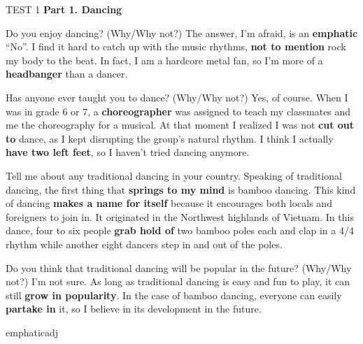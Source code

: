 \begin{glossarymc}[Cambridge 6]
    \begin{test}{TEST 1}
    \noindent
    \textbf{Part 1. Dancing}
    \begin{qa}{Do you enjoy dancing? (Why/Why not?)}
    The answer, I’m afraid, is an \textbf{emphatic} “No”. I find it hard to catch up with the music rhythms, \textbf{not to mention} rock my body to the beat. In fact, I am a hardcore metal fan, so I’m more of a \textbf{headbanger} than a dancer.
    \end{qa}

    \begin{qa}{Has anyone ever taught you to dance? (Why/Why not?)}
    Yes, of course. When I was in grade 6 or 7, a \textbf{choreographer} was assigned to teach my classmates and me the choreography for a musical. At that moment I realized I was not \textbf{cut out to} dance, as I kept disrupting the group’s natural rhythm. I think I actually \textbf{have two left feet}, so I haven’t tried dancing anymore.
    \end{qa}

    \begin{qa}{Tell me about any traditional dancing in your country.}
    Speaking of traditional dancing, the first thing that \textbf{springs to my mind} is bamboo dancing. This kind of dancing \textbf{makes a name for itself} because it encourages both locals and foreigners to join in. It originated in the Northwest highlands of Vietnam. In this dance, four to six people \textbf{grab hold of} two bamboo poles each and clap in a 4/4 rhythm while another eight dancers step in and out of the poles.
    \end{qa}

    \begin{qa}{Do you think that traditional dancing will be popular in the future? (Why/Why not?)}
    I’m not sure. As long as traditional dancing is easy and fun to play, it can still \textbf{grow in popularity}. In the case of bamboo dancing, everyone can easily \textbf{partake in} it, so I believe in its development in the future.
    \end{qa}

    
        \begin{VocabExplain}[Part 1]
            \begin{ExplainCard}{emphatic}{adj}
            \end{ExplainCard}


\end{VocabExplain}
\end{test}
\end{glossarymc}

